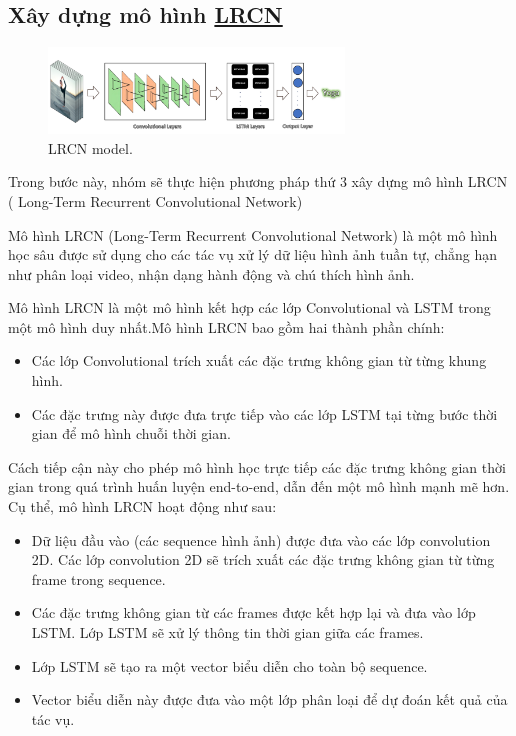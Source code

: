 \subsection{Xây dựng mô hình \href{https://arxiv.org/abs/1411.4389?source=post_page---------------------------}{LRCN}}
    \begin{figure}[h!]
	\centering
	\includegraphics[width=0.7\textwidth]{Figures/LRCN.png}
	\caption[LRCN model .]{LRCN model.}
	\label{LRCN.png} 
    \end{figure}
Trong bước này, nhóm sẽ thực hiện phương pháp thứ 3 xây dựng mô hình LRCN ( Long-Term Recurrent Convolutional Network)

Mô hình LRCN (Long-Term Recurrent Convolutional Network) là một mô hình học sâu được sử dụng cho các tác vụ xử lý dữ liệu hình ảnh tuần tự, chẳng hạn như phân loại video, nhận dạng hành động và chú thích hình ảnh.

Mô hình LRCN là một mô hình kết hợp các lớp Convolutional và LSTM trong một mô hình duy nhất.Mô hình LRCN bao gồm hai thành phần chính:
\begin{itemize}
    \item Các lớp Convolutional trích xuất các đặc trưng không gian từ từng khung hình.
    \item Các đặc trưng này được đưa trực tiếp vào các lớp LSTM tại từng bước thời gian để mô hình chuỗi thời gian.
\end{itemize}
Cách tiếp cận này cho phép mô hình học trực tiếp các đặc trưng không gian thời gian trong quá trình huấn luyện end-to-end, dẫn đến một mô hình mạnh mẽ hơn.
Cụ thể, mô hình LRCN hoạt động như sau:
\begin{itemize}
    \item Dữ liệu đầu vào (các sequence hình ảnh) được đưa vào các lớp convolution 2D. Các lớp convolution 2D sẽ trích xuất các đặc trưng không gian từ từng frame trong sequence.
    \item Các đặc trưng không gian từ các frames được kết hợp lại và đưa vào lớp LSTM. Lớp LSTM sẽ xử lý thông tin thời gian giữa các frames.
    \item Lớp LSTM sẽ tạo ra một vector biểu diễn cho toàn bộ sequence.
    \item Vector biểu diễn này được đưa vào một lớp phân loại để dự đoán kết quả của tác vụ.
\end{itemize}


